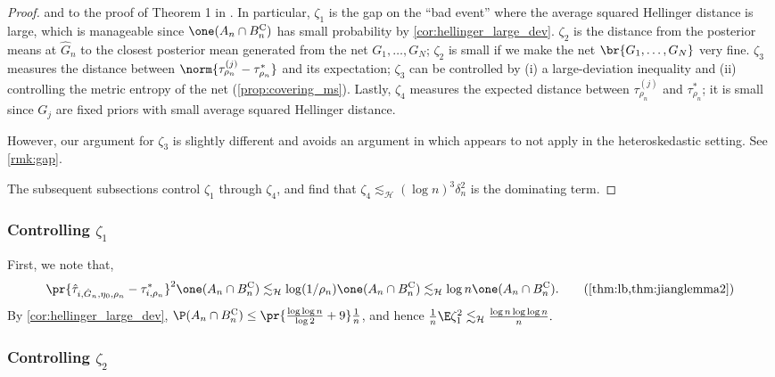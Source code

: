 \documentclass[12pt, reqno]{amsart}
\newcommand{\leH}{\lesssim_{\mathcal{H}}}
\newcommand{\comp}{\mathrm{C}}
\numberwithin{equation}{section}
\begin{document}
\begin{refsection}
\begin{appendices}
\begin{proof}
\citet{soloff2021multivariate} and to the proof of Theorem 1 in \citet{jiang2020general}. In
particular, $\zeta_1$ is the gap on the ``bad event'' where the average squared Hellinger
distance is large, which is manageable since $\one(A_n \cap B_n^\comp)$ has small
probability by \cref{cor:hellinger_large_dev}. $\zeta_2$ is the distance from the
posterior means at $\hat G_n$ to the closest posterior mean generated from the net
$G_1,\ldots, G_N$; $\zeta_2$ is small if we make the net $\br{G_1,\ldots, G_N}$ very fine.
$\zeta_3$ measures the
distance between $\norm{\tau_{\rho_n}^{(j)} - \tau_{\rho_n}^*}$ and its expectation;
$\zeta_3$ can be controlled by (i) a large-deviation inequality and (ii) controlling the
metric entropy of the net (\cref{prop:covering_ms}). Lastly, $\zeta_4$ measures the
expected distance between $\tau_{\rho_n}^{(j)} $ and $\tau_{\rho_n}^*$; it is small since
$G_j$ are fixed priors with small average squared Hellinger distance.

However, our argument for $\zeta_3$ is slightly different and avoids an argument in
\citet{jiang2009general} which appears to not apply in the heteroskedastic setting.
See \cref{rmk:gap}.


The subsequent subsections control $\zeta_1$ through $\zeta_4$, and find that $\zeta_4
\leH (\log n)^3 \delta_n^2$ is the dominating term.
\end{proof}



\subsubsection{Controlling $\zeta_1$}

First, we note that, \[
\pr{\hat\tau_{i, \hat G_n, \eta_0, \rho_n} - \tau^*_{i,\rho_n}}^2 \one(A_n \cap B_n^\comp) \leH
\log (1/\rho_n)  \one(A_n \cap B_n^\comp) \leH \log n \one(A_n \cap B_n^\comp).
\tag{\cref{thm:lb,thm:jianglemma2}}
\]
By \cref{cor:hellinger_large_dev}, $\P(A_n \cap B_n^\comp) \le \pr{\frac{\log\log n}{\log 2}
+ 9} \frac{1}{n}$, and hence $
\frac{1}{n}\E\zeta_1^2 \leH \frac{\log n  \log\log n}{n}.
$

\subsubsection{Controlling $\zeta_2$}


\end{appendices}
\end{refsection}
\end{document}
